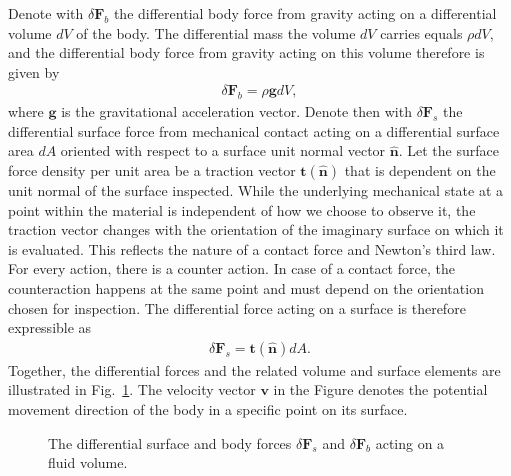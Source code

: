 Denote with $\delta \bm{F}_b$ the differential body force from gravity acting on a differential volume $dV$ of the body. The differential mass the volume $dV$ carries equals $\rho dV$, and the differential body force from gravity acting on this volume therefore is given by
\begin{align}
    \delta\bm{F}_b=\rho\bm{g}dV,
\end{align}
where $\bm{g}$ is the gravitational acceleration vector. Denote then with $\delta \mathbf{F}_s$ the differential surface force from mechanical contact acting on a differential surface area $dA$ oriented with respect to a surface unit normal vector $\mathbf{\hat{n}}$. Let the surface force density per unit area be a traction vector $\mathbf{t}(\mathbf{\hat{n}})$ that is dependent on the unit normal of the surface inspected. While the underlying mechanical state at a point within the material is independent of how we choose to observe it, the traction vector changes with the orientation of the imaginary surface on which it is evaluated. This reflects the nature of a contact force and Newton's third law. For every action, there is a counter action. In case of a contact force, the counteraction happens at the same point and must depend on the orientation chosen for inspection. The differential force acting on a surface is therefore expressible as
\begin{align}
    \delta\bm{F}_s=\bm{t}(\bm{\hat{n}})dA.
\end{align}
Together, the differential forces and the related volume and surface elements are illustrated in Fig.~\ref{fig:forces-velocity}. The velocity vector $\bm{v}$ in the Figure denotes the potential movement direction of the body in a specific point on its surface.
\begin{figure}[!htb]
    \centering
    
    \caption{The differential surface and body forces $\delta\bm{F}_s$ and $\delta\bm{F}_b$ acting on a fluid volume.}
    \label{fig:forces-velocity}
\end{figure}

